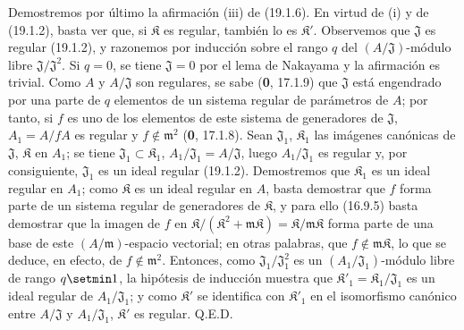 Demostremos por último la afirmación (iii) de (19.1.6). En virtud de (i) y de (19.1.2), basta ver que, si $\mathfrak K$ es regular, también lo es $\mathfrak K'$. Observemos que $\mathfrak J$ es regular (19.1.2), y razonemos por inducción sobre el rango $q$ del $(A/\mathfrak J)$-módulo libre $\mathfrak J/\mathfrak J^2$. Si $q=0$, se tiene $\mathfrak J=0$ por el lema de Nakayama y la afirmación es trivial. Como $A$ y $A/\mathfrak J$ son regulares, se sabe (\textbf{0}, 17.1.9) que $\mathfrak J$ está engendrado por una parte de $q$ elementos de un sistema regular de parámetros de $A$; por tanto, si $f$ es uno de los elementos de este sistema de generadores de $\mathfrak J$, $A_1=A/fA$ es regular y $f\notin\mathfrak m^2$ (\textbf{0}, 17.1.8). Sean $\mathfrak J_1$, $\mathfrak K_1$ las imágenes canónicas de $\mathfrak J$, $\mathfrak K$ en $A_1$; se tiene $\mathfrak J_1\subset\mathfrak K_1$, $A_1/\mathfrak J_1=A/\mathfrak J$, luego $A_1/\mathfrak J_1$ es regular y, por consiguiente, $\mathfrak J_1$ es un ideal regular (19.1.2). Demostremos que $\mathfrak K_1$ es un ideal regular en $A_1$; como $\mathfrak K$ es un ideal regular en $A$, basta demostrar que $f$ forma parte de un sistema regular de generadores de $\mathfrak K$, y para ello (16.9.5) basta demostrar que la imagen de $f$ en $\mathfrak K/(\mathfrak K^2+\mathfrak m\mathfrak K)=\mathfrak K/\mathfrak m\mathfrak K$ forma parte de una base de este $(A/\mathfrak m)$-espacio vectorial; en otras palabras, que $f\notin\mathfrak m\mathfrak K$, lo que se deduce, en efecto, de $f\notin\mathfrak m^2$. Entonces, como $\mathfrak J_1/\mathfrak J_1^2$ es un $(A_1/\mathfrak J_1)$-módulo libre de rango $q\setmin 1$, la hipótesis de inducción muestra que $\mathfrak K'_1=\mathfrak K_1/\mathfrak J_1$ es un ideal regular de $A_1/\mathfrak J_1$; y como $\mathfrak K'$ se identifica con $\mathfrak K'_1$ en el isomorfismo canónico entre $A/\mathfrak J$ y $A_1/\mathfrak J_1$, $\mathfrak K'$ es regular. Q.E.D.

